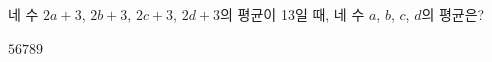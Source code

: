 네 수 $2a+3$, $2b+3$, $2c+3$, $2d+3$의 평균이 13일 때, 네 수 $a$, $b$, $c$, $d$의 평균은?
\begin{choices32}{$5$}{$6$}{$7$}{$8$}{$9$}\end{choices32}
